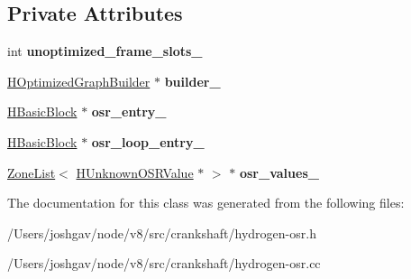 \subsection*{Private Attributes}
\begin{DoxyCompactItemize}
\item 
int {\bfseries unoptimized\+\_\+frame\+\_\+slots\+\_\+}\hypertarget{classv8_1_1internal_1_1_h_osr_builder_a982e198ff559cfe5f42fc92c8064835e}{}\label{classv8_1_1internal_1_1_h_osr_builder_a982e198ff559cfe5f42fc92c8064835e}

\item 
\hyperlink{classv8_1_1internal_1_1_h_optimized_graph_builder}{H\+Optimized\+Graph\+Builder} $\ast$ {\bfseries builder\+\_\+}\hypertarget{classv8_1_1internal_1_1_h_osr_builder_a8f15331483c621a8cbee5ac2f37a7ca8}{}\label{classv8_1_1internal_1_1_h_osr_builder_a8f15331483c621a8cbee5ac2f37a7ca8}

\item 
\hyperlink{classv8_1_1internal_1_1_h_basic_block}{H\+Basic\+Block} $\ast$ {\bfseries osr\+\_\+entry\+\_\+}\hypertarget{classv8_1_1internal_1_1_h_osr_builder_a52b820c2ae2e299b4687e4d3d9aebb52}{}\label{classv8_1_1internal_1_1_h_osr_builder_a52b820c2ae2e299b4687e4d3d9aebb52}

\item 
\hyperlink{classv8_1_1internal_1_1_h_basic_block}{H\+Basic\+Block} $\ast$ {\bfseries osr\+\_\+loop\+\_\+entry\+\_\+}\hypertarget{classv8_1_1internal_1_1_h_osr_builder_a3d7b9e41e4423948dd5313191c960881}{}\label{classv8_1_1internal_1_1_h_osr_builder_a3d7b9e41e4423948dd5313191c960881}

\item 
\hyperlink{classv8_1_1internal_1_1_zone_list}{Zone\+List}$<$ \hyperlink{classv8_1_1internal_1_1_h_unknown_o_s_r_value}{H\+Unknown\+O\+S\+R\+Value} $\ast$ $>$ $\ast$ {\bfseries osr\+\_\+values\+\_\+}\hypertarget{classv8_1_1internal_1_1_h_osr_builder_aa58da7d82a298653f738243c64e4fe89}{}\label{classv8_1_1internal_1_1_h_osr_builder_aa58da7d82a298653f738243c64e4fe89}

\end{DoxyCompactItemize}


The documentation for this class was generated from the following files\+:\begin{DoxyCompactItemize}
\item 
/\+Users/joshgav/node/v8/src/crankshaft/hydrogen-\/osr.\+h\item 
/\+Users/joshgav/node/v8/src/crankshaft/hydrogen-\/osr.\+cc\end{DoxyCompactItemize}
